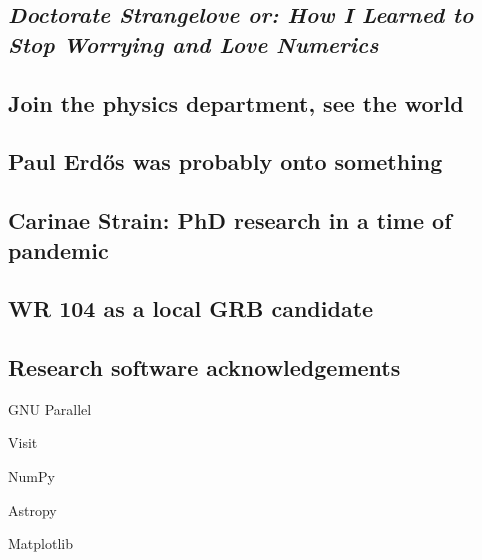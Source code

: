 \subsection[\textit{How I Learned to Stop Worrying and Love Numerics}]{\textit{Doctorate Strangelove or: How I Learned to Stop Worrying and Love Numerics}} 

\subsection{Join the physics department, see the world}

\subsection{Paul Erd\H{o}s was probably onto something}

\subsection{Carinae Strain: PhD research in a time of pandemic}

\subsection{WR 104 as a local GRB candidate}

\subsection{Research software acknowledgements}

GNU Parallel
\textcite{tange_2021_5523272}

Visit 
\textcite{HPV:VisIt}

NumPy
\textcite{harris2020array}

Astropy
\textcite{astropy:2013} \textcite{astropy:2018}

Matplotlib
\textcite{Hunter:2007}

